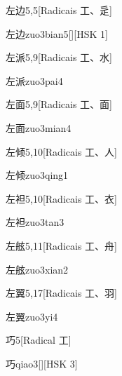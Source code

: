 \begin{entry}{左边}{5,5}[Radicais ⼯、⾡]
  \begin{phonetics}{左边}{zuo3bian5}[][HSK 1]
  \end{phonetics}
\end{entry}

\begin{entry}{左派}{5,9}[Radicais ⼯、⽔]
  \begin{phonetics}{左派}{zuo3pai4}
  \end{phonetics}
\end{entry}

\begin{entry}{左面}{5,9}[Radicais ⼯、⾯]
  \begin{phonetics}{左面}{zuo3mian4}
  \end{phonetics}
\end{entry}

\begin{entry}{左倾}{5,10}[Radicais ⼯、⼈]
  \begin{phonetics}{左倾}{zuo3qing1}
  \end{phonetics}
\end{entry}

\begin{entry}{左袒}{5,10}[Radicais ⼯、⾐]
  \begin{phonetics}{左袒}{zuo3tan3}
  \end{phonetics}
\end{entry}

\begin{entry}{左舷}{5,11}[Radicais ⼯、⾈]
  \begin{phonetics}{左舷}{zuo3xian2}
  \end{phonetics}
\end{entry}

\begin{entry}{左翼}{5,17}[Radicais ⼯、⽻]
  \begin{phonetics}{左翼}{zuo3yi4}
  \end{phonetics}
\end{entry}

\begin{entry}{巧}{5}[Radical ⼯]
  \begin{phonetics}{巧}{qiao3}[][HSK 3]
  \end{phonetics}
\end{entry}

